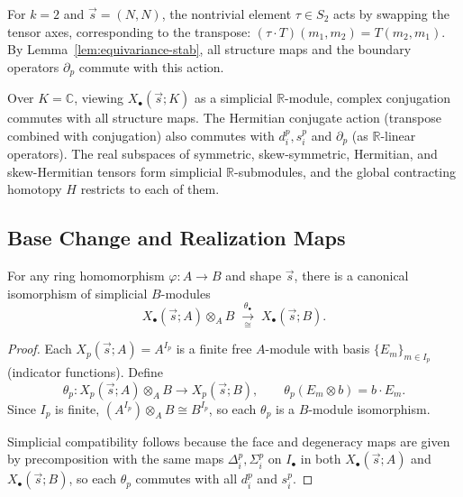 \begin{remark}
For $k=2$ and $\vec s=(N,N)$, the nontrivial element $\tau \in S_2$ acts by swapping the tensor axes, corresponding to the transpose: $(\tau\cdot T)(m_1, m_2) = T(m_2, m_1)$. By Lemma~\ref{lem:equivariance-stab}, all structure maps and the boundary operators $\partial_p$ commute with this action.

Over $K=\mathbb C$, viewing $X_\bullet(\vec s;K)$ as a simplicial
$\mathbb R$-module, complex conjugation commutes with all structure maps. The Hermitian conjugate action (transpose combined with conjugation) also commutes with $d_i^p,s_i^p$ and $\partial_p$ (as $\mathbb R$-linear operators). The
real subspaces of symmetric, skew-symmetric, Hermitian, and skew-Hermitian
tensors form simplicial $\mathbb R$-submodules, and the global
contracting homotopy $H$ restricts to each of them.
\end{remark}

\subsection{Base Change and Realization Maps}

\begin{proposition}\label{prop:base-change}
For any ring homomorphism $\varphi: A \to B$ and shape $\vec{s}$, there is a canonical isomorphism of simplicial $B$-modules
\[
X_\bullet(\vec{s};A) \otimes_A B \;\xrightarrow[\cong]{\theta_\bullet}\; X_\bullet(\vec{s};B).
\]
\end{proposition}

\begin{proof}
Each $X_p(\vec{s};A) = A^{I_p}$ is a finite free $A$-module with basis $\{E_m\}_{m \in I_p}$ (indicator functions). Define
\[
\theta_p: X_p(\vec{s};A) \otimes_A B \longrightarrow X_p(\vec{s};B), \qquad \theta_p(E_m \otimes b) = b \cdot E_m.
\]
Since $I_p$ is finite, $(A^{I_p}) \otimes_A B \cong B^{I_p}$, so each $\theta_p$ is a $B$-module isomorphism.

Simplicial compatibility follows because the face and degeneracy maps
are given by precomposition with the same maps
$\Delta_i^p,\Sigma_i^p$ on $I_\bullet$ in both
$X_\bullet(\vec{s};A)$ and $X_\bullet(\vec{s};B)$, so each $\theta_p$
commutes with all $d_i^p$ and $s_i^p$.
\end{proof}

